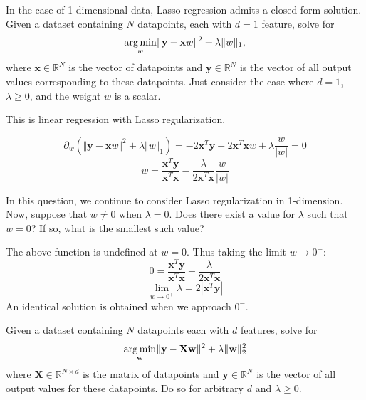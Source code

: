 \subproblem
In the case of 1-dimensional data, Lasso regression admits a closed-form solution.
Given a dataset containing $N$ datapoints, each with $d = 1$ feature, solve for
\[\underset{w}{\operatorname{arg\,min}} \Vert\mathbf{y} - \mathbf{x}w\Vert^2 + \lambda\Vert w\Vert_1,
\]
where $\mathbf{x} \in \mathbb{R}^{N}$ is the vector of datapoints and $\mathbf{y} \in \mathbb{R}^N$ is the  vector of all output values corresponding to these datapoints. Just consider the case where $d = 1$, $\lambda \geq 0$, and the weight $w$ is a scalar.

This is linear regression with Lasso regularization.

\begin{subsolution}
 \begin{equation}
   \partial_w(\Vert\mathbf{y} - \mathbf{x}w\Vert^2 + \lambda\Vert w\Vert_1) = -2\mathbf{x}^T\mathbf{y}+2\mathbf{x}^T\mathbf{x}w+\lambda \frac{w}{|w|}= 0
 \end{equation}
 \begin{equation}
  w = \frac{\mathbf{x}^T\mathbf{y}}{\mathbf{x}^T\mathbf{x}}-\frac{\lambda}{2\mathbf{x}^T\mathbf{x}}\frac{w}{|w|}
\end{equation}
\end{subsolution}

\subproblem
In this question, we continue to consider Lasso regularization in 1-dimension. Now, suppose that $w \neq 0$ when $\lambda = 0$. Does there exist a value for $\lambda$ such that $w = 0$? If so, what is the smallest such value?

\begin{subsolution}
  The above function is undefined at $w=0$. Thus taking the limit $w\rightarrow 0^+$:
  \begin{equation}
    0 = \frac{\mathbf{x}^T\mathbf{y}}{\mathbf{x}^T\mathbf{x}}-\frac{\lambda}{2\mathbf{x}^T\mathbf{x}}
  \end{equation}
  \begin{equation}
    \lim_{w\rightarrow 0^+}\lambda = 2|\mathbf{x}^T\mathbf{y}|
  \end{equation}
  An identical solution is obtained when we approach $0^-$.
\end{subsolution}

\problem[9]
\subproblem
Given a dataset containing $N$ datapoints each with $d$ features, solve for
\[\underset{\mathbf{w}}{\operatorname{arg\,min}} \Vert\mathbf{y} - \mathbf{X}\mathbf{w}\Vert^2 + \lambda\Vert\mathbf{w}\Vert_2^2
\]
where $\mathbf{X} \in \mathbb{R}^{N \times d}$ is the matrix of datapoints and $\mathbf{y} \in \mathbb{R}^N$ is the  vector of all output values for these datapoints. Do so for arbitrary $d$ and $\lambda \geq 0$.

